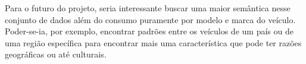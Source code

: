 \documentclass{report}
\begin{document}
Para o futuro do projeto, seria interessante buscar uma maior semântica nesse conjunto de dados além do consumo puramente por modelo e marca do veículo. Poder-se-ia, por exemplo, encontrar
padrões entre os veículos de um país ou de uma região específica para encontrar mais uma característica que pode ter razões geográficas ou até culturais.

\clearpage
\printbibliography
\thispagestyle{empty}
\end{document}
